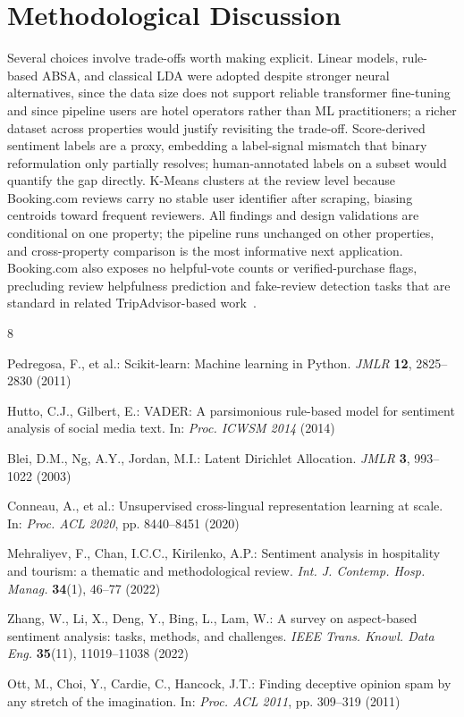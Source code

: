 \documentclass[runningheads]{llncs}
\begin{document}
\section{Methodological Discussion}
\label{sec:discussion}

Several choices involve trade-offs worth making explicit. Linear models,
rule-based ABSA, and classical LDA were adopted despite stronger neural
alternatives, since the data size does not support reliable transformer
fine-tuning and since pipeline users are hotel operators rather than ML
practitioners; a richer dataset across properties would justify
revisiting the trade-off. Score-derived sentiment labels are a proxy,
embedding a label-signal mismatch that binary reformulation only
partially resolves; human-annotated labels on a subset would quantify
the gap directly. K-Means clusters at the review level because
Booking.com reviews carry no stable user identifier after scraping,
biasing centroids toward frequent reviewers. All findings and design
validations are conditional on one property; the pipeline runs unchanged
on other properties, and cross-property comparison is the most
informative next application. Booking.com also exposes no helpful-vote
counts or verified-purchase flags, precluding review helpfulness
prediction and fake-review detection tasks that are standard in related
TripAdvisor-based work~\cite{ott2011}.

{\footnotesize
\begin{thebibliography}{8}
\setlength{\itemsep}{0pt}
\sloppy

Pedregosa, F., et al.: Scikit-learn: Machine learning in Python.
\textit{JMLR} \textbf{12}, 2825--2830 (2011)

Hutto, C.J., Gilbert, E.: VADER: A parsimonious rule-based model for
sentiment analysis of social media text. In: \textit{Proc. ICWSM 2014}
(2014)

Blei, D.M., Ng, A.Y., Jordan, M.I.: Latent Dirichlet Allocation.
\textit{JMLR} \textbf{3}, 993--1022 (2003)

Conneau, A., et al.: Unsupervised cross-lingual representation learning
at scale. In: \textit{Proc. ACL 2020}, pp. 8440--8451 (2020)

Mehraliyev, F., Chan, I.C.C., Kirilenko, A.P.: Sentiment analysis in
hospitality and tourism: a thematic and methodological review.
\textit{Int. J. Contemp. Hosp. Manag.} \textbf{34}(1), 46--77 (2022)

Zhang, W., Li, X., Deng, Y., Bing, L., Lam, W.: A survey on aspect-based
sentiment analysis: tasks, methods, and challenges. \textit{IEEE Trans.
Knowl. Data Eng.} \textbf{35}(11), 11019--11038 (2022)

Ott, M., Choi, Y., Cardie, C., Hancock, J.T.: Finding deceptive opinion
spam by any stretch of the imagination. In: \textit{Proc. ACL 2011},
pp. 309--319 (2011)

\end{thebibliography}
}
\end{document}
